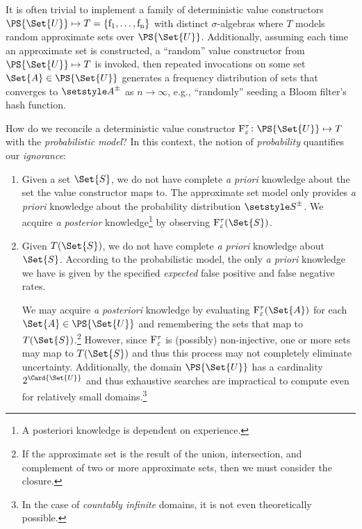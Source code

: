 \documentclass[10pt,final,hidelinks]{article}
\numberwithin{equation}{section}
\begin{document}
\begin{remark}
It is often trivial to implement a family of deterministic value constructors $\PS{\Set{U}} \mapsto T = \{\operatorname{f_1},\ldots,\operatorname{f_n}\}$ with distinct $\sigma$-algebras where $T$ models random approximate sets over $\PS{\Set{U}}$.
Additionally, assuming each time an approximate set is constructed, a ``random'' value constructor from $\PS{\Set{U}} \mapsto T$ is invoked, then repeated invocations on some set $\Set{A} \in \PS{\Set{U}}$ generates a frequency distribution of sets that converges to $\ASet{A}$ as $n \to \infty$, e.g., ``randomly'' seeding a Bloom filter's hash function.
\end{remark}

How do we reconcile a deterministic value constructor $\ctor{\fprate}{\tprate} \colon \PS{\Set{U}} \mapsto T$ with the \emph{probabilistic model}?
In this context, the notion of \emph{probability} quantifies our \emph{ignorance}:
\begin{enumerate}
\item Given a set $\Set{S}$, we do not have complete \emph{a priori} knowledge about the set the value constructor maps to.
The approximate set model only provides \emph{a priori} knowledge about the probability distribution $\ASet{S}$.
We acquire \emph{a posterior} knowledge\footnote{A posteriori knowledge is dependent on experience.} by observing $\ctor{\fprate}{\tprate}(\Set{S})$.

\item Given $T(\Set{S})$, we do not have complete \emph{a priori} knowledge about $\Set{S}$.
According to the probabilistic model, the only \emph{a priori} knowledge we have is given by the specified \emph{expected} false positive and false negative rates.

We may acquire \emph{a posteriori} knowledge by evaluating $\ctor{\fprate}{\tprate}(\Set{A})$ for each $\Set{A} \in \PS{\Set{U}}$ and remembering the sets that map to $T(\Set{S})$.\footnote{If the approximate set is the result of the union, intersection, and complement of two or more approximate sets, then we must consider the closure.}
However, since $\ctor{\fprate}{\tprate}$ is (possibly) non-injective, one or more sets may map to $T(\Set{S})$ and thus this process may not completely eliminate uncertainty.
Additionally, the domain $\PS{\Set{U}}$ has a cardinality $2^{\Card{\Set{U}}}$ and thus exhaustive searches are impractical to compute even for relatively small domains.\footnote{In the case of \emph{countably infinite} domains, it is not even theoretically possible.}
\end{enumerate}
\end{document}
